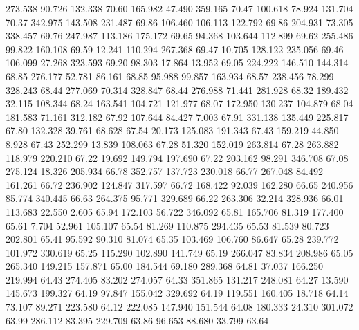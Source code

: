  273.538   90.726  132.338        70.60
 165.982   47.490  359.165        70.47
 100.618   78.924  131.704        70.37
 342.975  143.508  231.487        69.86
 106.460  106.113  122.792        69.86
 204.931   73.305  338.457        69.76
 247.987  113.186  175.172        69.65
  94.368  103.644  112.899        69.62
 255.486   99.822  160.108        69.59
  12.241  110.294  267.368        69.47
  10.705  128.122  235.056        69.46
 106.099   27.268  323.593        69.20
  98.303   17.864   13.952        69.05
 224.222  146.510  144.314        68.85
 276.177   52.781   86.161        68.85
  95.988   99.857  163.934        68.57
 238.456   78.299  328.243        68.44
 277.069   70.314  328.847        68.44
 276.988   71.441  281.928        68.32
 189.432   32.115  108.344        68.24
 163.541  104.721  121.977        68.07
 172.950  130.237  104.879        68.04
 181.583   71.161  312.182        67.92
 107.644   84.427    7.003        67.91
 331.138  135.449  225.817        67.80
 132.328   39.761   68.628        67.54
  20.173  125.083  191.343        67.43
 159.219   44.850    8.928        67.43
 252.299   13.839  108.063        67.28
  51.320  152.019  263.814        67.28
 263.882  118.979  220.210        67.22
  19.692  149.794  197.690        67.22
 203.162   98.291  346.708        67.08
 275.124   18.326  205.934        66.78
 352.757  137.723  230.018        66.77
 267.048   84.492  161.261        66.72
 236.902  124.847  317.597        66.72
 168.422   92.039  162.280        66.65
 240.956   85.774  340.445        66.63
 264.375   95.771  329.689        66.22
 263.306   32.214  328.936        66.01
 113.683   22.550    2.605        65.94
 172.103   56.722  346.092        65.81
 165.706   81.319  177.400        65.61
   7.704   52.961  105.107        65.54
  81.269  110.875  294.435        65.53
  81.539   80.723  202.801        65.41
  95.592   90.310   81.074        65.35
 103.469  106.760   86.647        65.28
 239.772  101.972  330.619        65.25
 115.290  102.890  141.749        65.19
 266.047   83.834  208.986        65.05
 265.340  149.215  157.871        65.00
 184.544   69.180  289.368        64.81
  37.037  166.250  219.994        64.43
 274.405   83.202  274.057        64.33
 351.865  131.217  248.081        64.27
  13.590  145.673  199.327        64.19
  97.847  155.042  329.692        64.19
 119.551  160.405   18.718        64.14
  73.107   89.271  223.580        64.12
 222.085  147.940  151.544        64.08
 180.333   24.310  301.072        63.99
 286.112   83.395  229.709        63.86
  96.653   88.680   33.799        63.64

